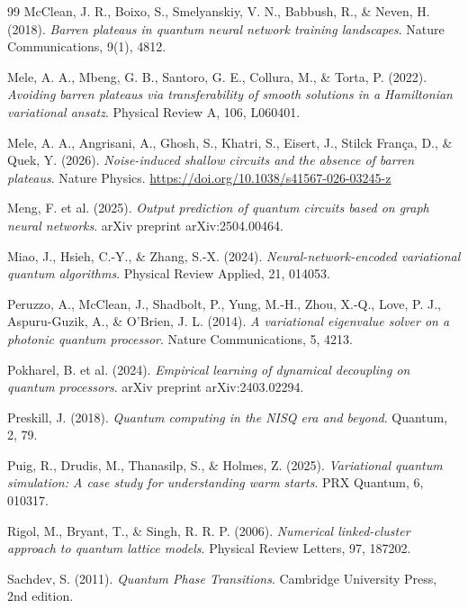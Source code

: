 \documentclass[11pt,a4paper,spanish]{book}
\begin{document}
\begin{thebibliography}{99}
 McClean, J. R., Boixo, S., Smelyanskiy, V. N., Babbush, R., \& Neven, H. (2018). \emph{Barren plateaus in quantum neural network training landscapes}. Nature Communications, 9(1), 4812.

 Mele, A. A., Mbeng, G. B., Santoro, G. E., Collura, M., \& Torta, P. (2022). \emph{Avoiding barren plateaus via transferability of smooth solutions in a Hamiltonian variational ansatz}. Physical Review A, 106, L060401.

 Mele, A. A., Angrisani, A., Ghosh, S., Khatri, S., Eisert, J., Stilck Fran\c{c}a, D., \& Quek, Y. (2026). \emph{Noise-induced shallow circuits and the absence of barren plateaus}. Nature Physics. \url{https://doi.org/10.1038/s41567-026-03245-z}

 Meng, F. et al. (2025). \emph{Output prediction of quantum circuits based on graph neural networks}. arXiv preprint arXiv:2504.00464.

 Miao, J., Hsieh, C.-Y., \& Zhang, S.-X. (2024). \emph{Neural-network-encoded variational quantum algorithms}. Physical Review Applied, 21, 014053.

 Peruzzo, A., McClean, J., Shadbolt, P., Yung, M.-H., Zhou, X.-Q., Love, P. J., Aspuru-Guzik, A., \& O'Brien, J. L. (2014). \emph{A variational eigenvalue solver on a photonic quantum processor}. Nature Communications, 5, 4213.

 Pokharel, B. et al. (2024). \emph{Empirical learning of dynamical decoupling on quantum processors}. arXiv preprint arXiv:2403.02294.

 Preskill, J. (2018). \emph{Quantum computing in the NISQ era and beyond}. Quantum, 2, 79.

 Puig, R., Drudis, M., Thanasilp, S., \& Holmes, Z. (2025). \emph{Variational quantum simulation: A case study for understanding warm starts}. PRX Quantum, 6, 010317.

 Rigol, M., Bryant, T., \& Singh, R. R. P. (2006). \emph{Numerical linked-cluster approach to quantum lattice models}. Physical Review Letters, 97, 187202.

 Sachdev, S. (2011). \emph{Quantum Phase Transitions}. Cambridge University Press, 2nd edition.


\end{thebibliography}
\end{document}
